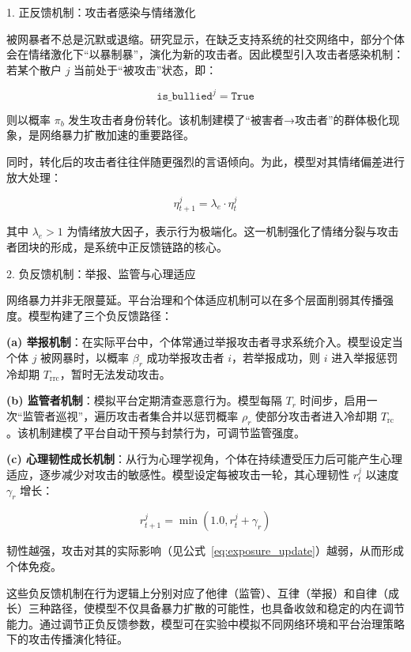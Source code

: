 1. 正反馈机制：攻击者感染与情绪激化

被网暴者不总是沉默或退缩。研究显示，在缺乏支持系统的社交网络中，部分个体会在情绪激化下“以暴制暴”，演化为新的攻击者。因此模型引入攻击者感染机制：若某个散户 \( j \) 当前处于“被攻击”状态，即：

\[
\texttt{is\_bullied}^j = \texttt{True}
\]

则以概率 \( \pi_b \) 发生攻击者身份转化。该机制建模了“被害者→攻击者”的群体极化现象，是网络暴力扩散加速的重要路径。

同时，转化后的攻击者往往伴随更强烈的言语倾向。为此，模型对其情绪偏差进行放大处理：

\begin{equation}
\eta_{t+1}^j = \lambda_e \cdot \eta_t^j
\label{eq:emotion_amplify}
\end{equation}

其中 \( \lambda_e > 1 \) 为情绪放大因子，表示行为极端化。这一机制强化了情绪分裂与攻击者团块的形成，是系统中正反馈链路的核心。

2. 负反馈机制：举报、监管与心理适应

网络暴力并非无限蔓延。平台治理和个体适应机制可以在多个层面削弱其传播强度。模型构建了三个负反馈路径：

\textbf{(a) 举报机制}：在实际平台中，个体常通过举报攻击者寻求系统介入。模型设定当个体 \( j \) 被网暴时，以概率 \( \beta_r \) 成功举报攻击者 \( i \)，若举报成功，则 \( i \) 进入举报惩罚冷却期 \( T_{\text{rrc}} \)，暂时无法发动攻击。

\textbf{(b) 监管者机制}：模拟平台定期清查恶意行为。模型每隔 \( T_r \) 时间步，启用一次“监管者巡视”，遍历攻击者集合并以惩罚概率 \( \rho_r \) 使部分攻击者进入冷却期 \( T_{\text{rc}} \)。该机制建模了平台自动干预与封禁行为，可调节监管强度。

\textbf{(c) 心理韧性成长机制}：从行为心理学视角，个体在持续遭受压力后可能产生心理适应，逐步减少对攻击的敏感性。模型设定每被攻击一轮，其心理韧性 \( r_t^j \) 以速度 \( \gamma_r \) 增长：

\begin{equation}
r_{t+1}^j = \min(1.0, r_t^j + \gamma_r)
\label{eq:resilience_growth}
\end{equation}

韧性越强，攻击对其的实际影响（见公式~\ref{eq:exposure_update}）越弱，从而形成个体免疫。

这些负反馈机制在行为逻辑上分别对应了他律（监管）、互律（举报）和自律（成长）三种路径，使模型不仅具备暴力扩散的可能性，也具备收敛和稳定的内在调节能力。通过调节正负反馈参数，模型可在实验中模拟不同网络环境和平台治理策略下的攻击传播演化特征。
